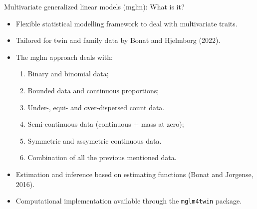 \documentclass[
  ignorenonframetext,
  serif,
  professionalfont,
  usenames,
  dvipsnames,
  aspectratio = 169]{beamer}
\providecommand{\tightlist}{%
  \setlength{\itemsep}{0pt}\setlength{\parskip}{0pt}}
\renewcommand{\tightlist}{%
  \setlength{\itemsep}{0\baselineskip}
  \setlength{\parskip}{0.25\baselineskip}
}
\begin{document}
\begin{frame}[fragile]{Multivariate generalized linear models (mglm):
What is it?}
\protect\hypertarget{multivariate-generalized-linear-models-mglm-what-is-it}{}
\begin{itemize}
\tightlist
\item
  Flexible statistical modelling framework to deal with multivariate
  traits.
\item
  Tailored for twin and family data by Bonat and Hjelmborg (2022).
\item
  The mglm approach deals with:

  \begin{enumerate}
  \tightlist
  \item
    Binary and binomial data;
  \item
    Bounded data and continuous proportions;
  \item
    Under-, equi- and over-dispersed count data.
  \item
    Semi-continuous data (continuous \(+\) mass at zero);
  \item
    Symmetric and assymetric continuous data.
  \item
    Combination of all the previous mentioned data.
  \end{enumerate}
\item
  Estimation and inference based on estimating functions (Bonat and
  Jorgense, 2016).
\item
  Computational implementation available through the \texttt{mglm4twin}
  package.
\end{itemize}
\end{frame}
\end{document}
